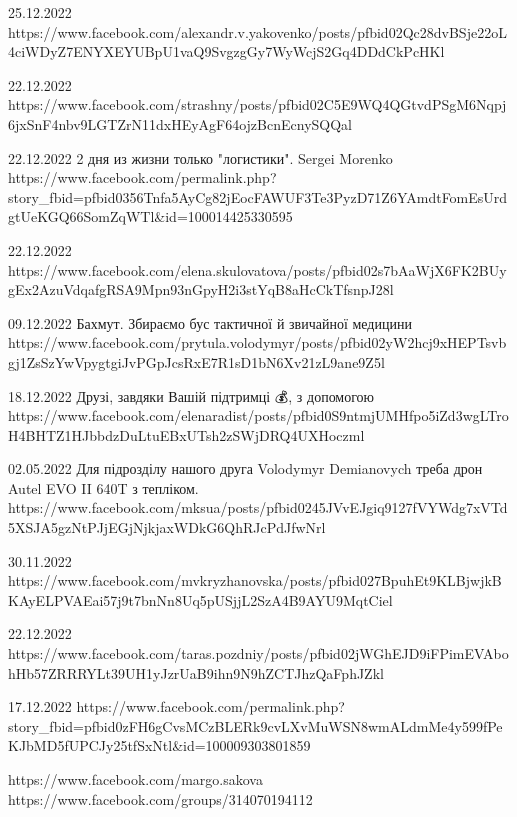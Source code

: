 25.12.2022
https://www.facebook.com/alexandr.v.yakovenko/posts/pfbid02Qc28dvBSje22oL4ciWDyZ7ENYXEYUBpU1vaQ9SvgzgGy7WyWcjS2Gq4DDdCkPcHKl

22.12.2022
https://www.facebook.com/strashny/posts/pfbid02C5E9WQ4QGtvdPSgM6Nqpj6jxSnF4nbv9LGTZrN11dxHEyAgF64ojzBcnEcnySQQal

22.12.2022
2 дня из жизни только "логистики".
Sergei Morenko
https://www.facebook.com/permalink.php?story_fbid=pfbid0356Tnfa5AyCg82jEocFAWUF3Te3PyzD71Z6YAmdtFomEsUrdgtUeKGQ66SomZqWTl&id=100014425330595

22.12.2022
https://www.facebook.com/elena.skulovatova/posts/pfbid02s7bAaWjX6FK2BUygEx2AzuVdqafgRSA9Mpn93nGpyH2i3stYqB8aHcCkTfsnpJ28l

09.12.2022
Бахмут. Збираємо бус тактичної й звичайної медицини
https://www.facebook.com/prytula.volodymyr/posts/pfbid02yW2hcj9xHEPTsvbgj1ZsSzYwVpygtgiJvPGpJcsRxE7R1sD1bN6Xv21zL9ane9Z5l

18.12.2022
Друзі, завдяки Вашій підтримці 💰, з  допомогою
https://www.facebook.com/elenaradist/posts/pfbid0S9ntmjUMHfpo5iZd3wgLTroH4BHTZ1HJbbdzDuLtuEBxUTsh2zSWjDRQ4UXHoczml

02.05.2022
Для підрозділу нашого друга Volodymyr Demianovych треба дрон Autel EVO II 640T з тепліком.
https://www.facebook.com/mksua/posts/pfbid0245JVvEJgiq9127fVYWdg7xVTd5XSJA5gzNtPJjEGjNjkjaxWDkG6QhRJcPdJfwNrl

30.11.2022
https://www.facebook.com/mvkryzhanovska/posts/pfbid027BpuhEt9KLBjwjkBKAyELPVAEai57j9t7bnNn8Uq5pUSjjL2SzA4B9AYU9MqtCiel

22.12.2022
https://www.facebook.com/taras.pozdniy/posts/pfbid02jWGhEJD9iFPimEVAbohHb57ZRRRYLt39UH1yJzrUaB9ihn9N9hZCTJhzQaFphJZkl

17.12.2022
https://www.facebook.com/permalink.php?story_fbid=pfbid0zFH6gCvsMCzBLERk9cvLXvMuWSN8wmALdmMe4y599fPeKJbMD5fUPCJy25tfSxNtl&id=100009303801859

https://www.facebook.com/margo.sakova
https://www.facebook.com/groups/314070194112
